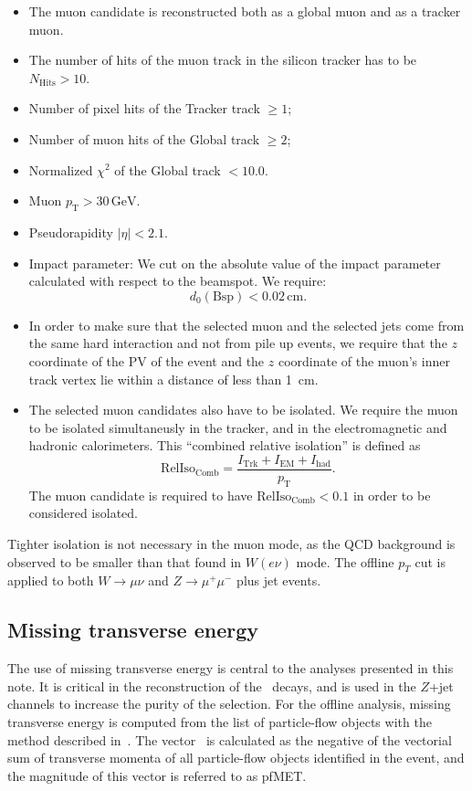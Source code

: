 \begin{itemize}
\item The muon candidate is reconstructed both as a global muon and
as a tracker muon.
\item The number of hits of the muon track in the silicon tracker has
to be $N_{\mathrm{Hits}} > 10$.
\item Number of pixel hits of the Tracker track $\ge 1$;
\item Number of muon hits of the Global track $\ge 2$;
\item Normalized $\chi^{2}$ of the Global track $< 10.0$.
\item Muon $p_{\mathrm{T}} > 30\,\mathrm{GeV}$.
\item Pseudorapidity $|\eta| < 2.1$.
\item Impact parameter: We cut on the absolute value of the impact
parameter calculated with respect to the beamspot. We require:
\begin{equation*}
 d_0(\mathrm{Bsp}) < 0.02\,\mathrm{cm}.
\end{equation*}
\item In order to make sure that the selected muon and the selected
jets come from the same hard interaction and not from pile up events,
we require that the $z$ coordinate of the PV of the event and the $z$
coordinate of the muon's inner track vertex lie within a distance of
less than 1~cm.
\item The selected muon candidates also have to be isolated.
We require the muon to be isolated simultaneusly in the
tracker, and in the electromagnetic and hadronic calorimeters.  
This ``combined relative isolation'' is defined as
\begin{equation*}
\mathrm{RelIso_{\mathrm{Comb}}} = \frac{I_{\mathrm{Trk}}+I_{\mathrm{EM}}+I_{\mathrm{had}}}{p_\mathrm{T}}.
\end{equation*} 
The muon candidate is required to have
$\mathrm{RelIso_{\mathrm{Comb}}} < 0.1$ in order to be considered
isolated.
\end{itemize}

Tighter isolation is not necessary in the muon mode, as the QCD background is
observed to be smaller than that found in $W(e\nu)$ mode.
The offline $p_T$ cut is applied to both $W \to \mu\nu$ and $Z \to \mu^+\mu^-$ plus jet events.




\subsection{Missing transverse energy}

The use of missing transverse energy is central to the analyses presented in this
note.  It is critical in the reconstruction of the \WtoLN\ decays, and
is used in the $Z$+jet channels to increase the purity of the selection.
 For the offline analysis, missing transverse 
energy is computed from the list of particle-flow objects with the method described 
in~\cite{CMS-PAS-JME-10-003}.  The vector \VEtmiss\ is calculated as the negative of 
the vectorial sum of transverse momenta of all particle-flow objects identified in the 
event, and the magnitude of this vector is referred to as pfMET.  

